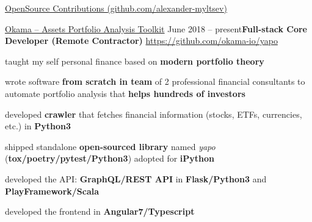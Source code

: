 \documentclass{resume} %
\begin{document}

\begin{rSection}{\href{https://github.com/alexander-myltsev?tab=repositories}{OpenSource
Contributions (github.com/alexander-myltsev)}}


\begin{samepage}
\begin{rSubsection}{\href{https://github.com/okama-io/yapo}
{Okama -- Assets Portfolio Analysis Toolkit}}
{June 2018 -- present}{\textbf{Full-stack Core Developer (Remote Contractor)}}
{\href{https://github.com/okama-io/yapo}{https://github.com/okama-io/yapo}}
\item taught my self personal finance based on \textbf{modern portfolio theory} 
\item wrote software \textbf{from scratch in team} of 2 professional financial consultants to automate portfolio analysis that \textbf{helps hundreds of investors}
\item developed \textbf{crawler} that fetches financial information (stocks, ETFs, currencies, etc.) in \textbf{Python3}
\item shipped standalone \textbf{open-sourced library} named \textit{yapo} (\textbf{tox/poetry/pytest/Python3}) adopted
for \textbf{iPython}
\item developed the API: \textbf{GraphQL/REST API} in \textbf{Flask/Python3} and \textbf{PlayFramework/Scala}
\item developed the frontend in \textbf{Angular7/Typescript}
\end{rSubsection}
\end{samepage}


\end{rSection}
\end{document}
